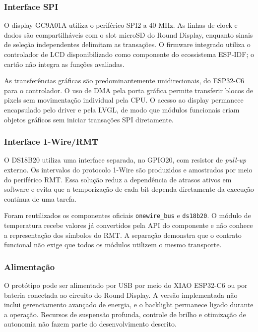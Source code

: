 \documentclass[a4paper,12pt]{article}
\begin{document}
\subsubsection{Interface SPI}


O display GC9A01A utiliza o perif\'erico SPI2 a 40 MHz. As linhas de clock e dados s\~ao compartilh\'aveis com o slot microSD do Round Display, enquanto sinais de sele\c{c}\~ao independentes delimitam as transa\c{c}\~oes. O firmware integrado utiliza o controlador de LCD disponibilizado como componente do ecossistema ESP-IDF; o cart\~ao n\~ao integra as fun\c{c}\~oes avaliadas.


As transfer\^encias gr\'aficas s\~ao predominantemente unidirecionais, do ESP32-C6 para o controlador. O uso de DMA pela porta gr\'afica permite transferir blocos de pixels sem movimenta\c{c}\~ao individual pela CPU. O acesso ao display permanece encapsulado pelo driver e pela LVGL, de modo que m\'odulos funcionais criam objetos gr\'aficos sem iniciar transa\c{c}\~oes SPI diretamente.


\subsubsection{Interface 1-Wire/RMT}


O DS18B20 utiliza uma interface separada, no GPIO20, com resistor de \emph{pull-up} externo. Os intervalos do protocolo 1-Wire s\~ao produzidos e amostrados por meio do perif\'erico RMT. Essa solu\c{c}\~ao reduz a depend\^encia de atrasos ativos em software e evita que a temporiza\c{c}\~ao de cada bit dependa diretamente da execu\c{c}\~ao cont\'inua de uma tarefa.


Foram reutilizados os componentes oficiais \texttt{onewire\_bus} e \texttt{ds18b20}. O m\'odulo de temperatura recebe valores j\'a convertidos pela API do componente e n\~ao conhece a representa\c{c}\~ao dos s\'imbolos do RMT. A separa\c{c}\~ao demonstra que o contrato funcional n\~ao exige que todos os m\'odulos utilizem o mesmo transporte.


\subsubsection{Alimenta\c{c}\~ao}


O prot\'otipo pode ser alimentado por USB por meio do XIAO ESP32-C6 ou por bateria conectada ao circuito do Round Display. A vers\~ao implementada n\~ao inclui gerenciamento avan\c{c}ado de energia, e o backlight permanece ligado durante a opera\c{c}\~ao. Recursos de suspens\~ao profunda, controle de brilho e otimiza\c{c}\~ao de autonomia n\~ao fazem parte do desenvolvimento descrito.
\end{document}
